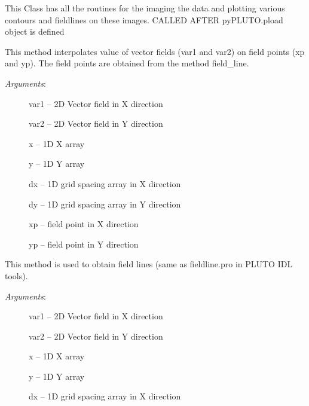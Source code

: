\documentclass[letterpaper,10pt,english]{sphinxmanual}
\begin{document}
\begin{fulllineitems}
\label{image:pyPLUTO.Image}
This Class has all the routines for the imaging the data
and plotting various contours and fieldlines on these images.
CALLED AFTER pyPLUTO.pload object is defined

\begin{fulllineitems}
\label{image:pyPLUTO.Image.field_interp}
This method interpolates value of vector fields (var1 and var2) on field points (xp and yp).
The field points are obtained from the method field\_line.
\begin{description}
\item[{\emph{Arguments}:}] \leavevmode
var1 -- 2D Vector field in X direction

var2 -- 2D Vector field in Y direction

x -- 1D X array

y -- 1D Y array

dx -- 1D grid spacing array in X direction

dy -- 1D grid spacing array in Y direction

xp -- field point in X direction

yp -- field point in Y direction

\end{description}

\end{fulllineitems}


\begin{fulllineitems}
\label{image:pyPLUTO.Image.field_line}
This method is used to obtain field lines (same as fieldline.pro in PLUTO IDL tools).
\begin{description}
\item[{\emph{Arguments}:}] \leavevmode
var1 -- 2D Vector field in X direction

var2 -- 2D Vector field in Y direction

x -- 1D X array

y -- 1D Y array

dx -- 1D grid spacing array in X direction


\end{description}
\end{fulllineitems}
\end{fulllineitems}
\end{document}

